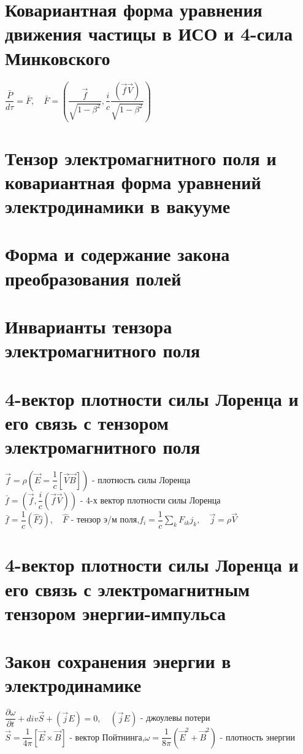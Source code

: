 \begin{multicols*}{2}
		\section{Ковариантная форма уравнения движения частицы в ИСО и 4-сила Минковского}
		$\dfrac{\bar{P}}{d\tau} = \bar{F},\quad \bar{F} = (\dfrac{\vec{f}}{\sqrt{1-\beta^2}}, \dfrac{i}{c}\dfrac{(\vec{f}\vec{V})}{\sqrt{1-\beta^2}})$
		
		\section{Тензор электромагнитного поля и ковариантная форма уравнений электродинамики в вакууме}
		
		\section{Форма и содержание закона преобразования полей}
		
		\section{Инварианты тензора электромагнитного поля}
		
		\section{4-вектор плотности силы Лоренца и его связь с тензором электромагнитного поля}
		$\vec{f} = \rho (\vec{E} = \dfrac{1}{c}\left[\vec{V}\vec{B}\right])$ - плотность силы Лоренца\\
		$\bar{f} = (\vec{f}, \dfrac{i}{c}(\vec{f}\vec{V}))$ - 4-х вектор плотности силы Лоренца\\
		$\bar{f} = \dfrac{1}{c}(\hat{F}\bar{j}), \quad \hat{F}$ - тензор э/м поля,\quad $f_i = \dfrac{1}{c}\sum_{k}^{}F_{ik}j_k, \quad \vec{j} = \rho \vec{V}$
		
		\section{4-вектор плотности силы Лоренца и его связь с электромагнитным тензором энергии-импульса}
		
		\section{Закон сохранения энергии в электродинамике}
		$\dfrac{\partial \omega}{\partial t} + div \vec{S} + (\vec{j}E) = 0, \quad (\vec{j}E)$ - джоулевы потери\\
		$\vec{S} = \dfrac{1}{4\pi}\left[\vec{E}\times \vec{B}\right]$ - вектор Пойтнинга,\quad $\omega = \dfrac{1}{8\pi}(\vec{E}^2 + \vec{B}^2)$ - плотность энергии
		

\end{multicols*}
